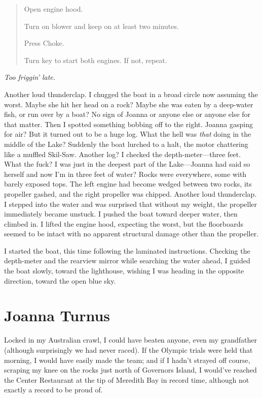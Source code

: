 \begin{quote}
Open engine hood.

Turn on blower and keep on at least two minutes.

Press Choke.

Turn key to start both engines. If not, repeat.
\end{quote}

\noindent \emph{Too friggin' late.}

Another loud thunderclap. I chugged the boat in a broad circle now
assuming the worst. Maybe she hit her head on a rock? Maybe she was
eaten by a deep-water fish, or run over by a boat? No sign of Joanna or
anyone else or anyone else for that matter. Then I spotted something
bobbing off to the right. Joanna gasping for air? But it turned out to
be a huge log. What the hell was \emph{that} doing in the middle of the
Lake? Suddenly the boat lurched to a halt, the motor chattering like a
muffled Skil-Saw. Another log? I checked the depth-meter---three feet.
What the fuck? I was just in the deepest part of the Lake---Joanna had
said so herself and now I'm in three feet of water? Rocks were
everywhere, some with barely exposed tops. The left engine had become
wedged between two rocks, its propeller gashed, and the right propeller
was chipped. Another loud thunderclap. I stepped into the water and was
surprised that without my weight, the propeller immediately became
unstuck. I pushed the boat toward deeper water, then climbed in. I
lifted the engine hood, expecting the worst, but the floorboards seemed
to be intact with no apparent structural damage other than the
propeller.

I started the boat, this time following the laminated instructions.
Checking the depth-meter and the rearview mirror while searching the
water ahead, I guided the boat slowly, toward the lighthouse, wishing I
was heading in the opposite direction, toward the open blue sky.

\chapter{Joanna Turnus}

\titlemark

Locked in my Australian crawl, I could have beaten anyone, even my
grandfather (although surprisingly we had never raced). If the Olympic
trials were held that morning, I would have easily made the team; and if
I hadn't strayed off course, scraping my knee on the rocks just north of
Governors Island, I would've reached the Center Restaurant at the tip of
Meredith Bay in record time, although not exactly a record to be proud
of.

